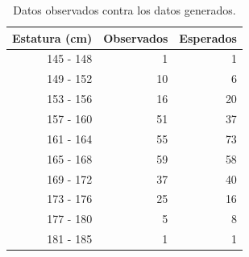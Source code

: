 \documentclass[12pt,letterpaper]{article}
\begin{document}
\begin{table}
\centering
\caption{Datos observados contra los datos generados.}
\begin{tabular}{rrr}
  \hline
Estatura (cm) & Observados & Esperados \\ 
  \hline
145 - 148 & 1 & 1 \\ 
149 - 152 & 10 & 6 \\ 
153 - 156 & 16 & 20 \\ 
157 - 160 & 51 & 37 \\
161 - 164 & 55 & 73 \\
165 - 168 & 59 & 58 \\
169 - 172 & 37 & 40 \\
173 - 176 & 25 & 16 \\
177 - 180 & 5 & 8 \\
181 - 185 & 1 & 1  \\
\hline
\end{tabular}
\label{data}
\end{table}
\end{document}

